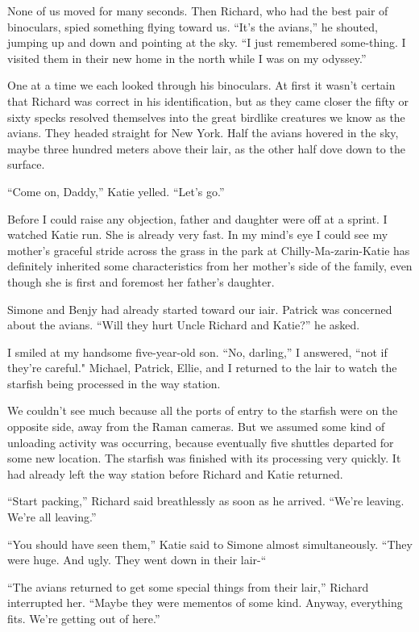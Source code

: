 \documentclass[]{article}
\begin{document}
{None of us moved for many seconds.  Then Richard, who had the best pair of binoculars, spied something flying toward us.  “It’s the avians,” he shouted, jumping up and down and pointing at the sky.  “I just remembered some-thing.  I visited them in their new home in the north while I was on my odyssey.”

One at a time we each looked through his binoculars.  At first it wasn’t certain that Richard was correct in his identification, but as they came closer the fifty or sixty specks resolved themselves into the great birdlike creatures we know as the avians.  They headed straight for New York.  Half the avians hovered in the sky, maybe three hundred meters above their lair, as the other half dove down to the surface.

“Come on, Daddy,” Katie yelled.  “Let’s go.”

Before I could raise any objection, father and daughter were off at a sprint.  I watched Katie run.  She is already very fast.  In my mind’s eye I could see my mother’s graceful stride across the grass in the park at Chilly-Ma-zarin-Katie has definitely inherited some characteristics from her mother’s side of the family, even though she is first and foremost her father’s daughter.

Simone and Benjy had already started toward our iair.  Patrick was concerned about the avians.  “Will they hurt Uncle Richard and Katie?” he asked.

I smiled at my handsome five-year-old son.  “No, darling,” I answered, “not if they’re careful."  Michael, Patrick, Ellie, and I returned to the lair to watch the starfish being processed in the way station.

We couldn’t see much because all the ports of entry to the starfish were on the opposite side, away from the Raman cameras.  But we assumed some kind of unloading activity was occurring, because eventually five shuttles departed for some new location.  The starfish was finished with its processing very quickly.  It had already left the way station before Richard and Katie returned.

“Start packing,” Richard said breathlessly as soon as he arrived.  “We’re leaving.  We’re all leaving.”

“You should have seen them,” Katie said to Simone almost simultaneously.  “They were huge.  And ugly.  They went down in their lair-“

“The avians returned to get some special things from their lair,” Richard interrupted her.  “Maybe they were mementos of some kind.  Anyway, everything fits.  We’re getting out of here.”

}
\end{document}
